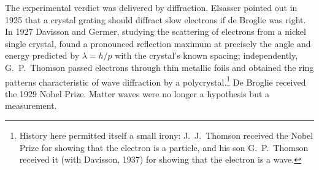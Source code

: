 The experimental verdict was delivered by diffraction. Elsasser pointed out in 1925 that a crystal grating should diffract slow electrons if de Broglie was right. In 1927 Davisson and Germer, studying the scattering of electrons from a nickel single crystal, found a pronounced reflection maximum at precisely the angle and energy predicted by $\lambda=h/p$ with the crystal's known spacing; independently, G.~P.~Thomson passed electrons through thin metallic foils and obtained the ring patterns characteristic of wave diffraction by a polycrystal.\footnote{History here permitted itself a small irony: J.~J.~Thomson received the Nobel Prize for showing that the electron is a particle, and his son G.~P.~Thomson received it (with Davisson, 1937) for showing that the electron is a wave.} De Broglie received the 1929 Nobel Prize. Matter waves were no longer a hypothesis but a measurement.

